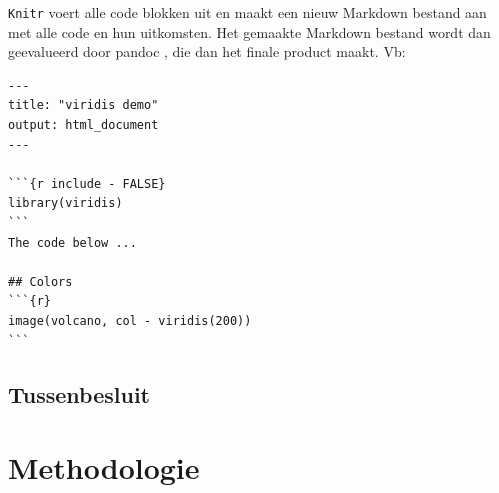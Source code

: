 \texttt{Knitr} voert alle code blokken uit en maakt een nieuw Markdown bestand aan met alle code en hun uitkomsten.
Het gemaakte Markdown bestand wordt dan geevalueerd door pandoc \autocite{pandoc}, die dan het finale product maakt.
Vb:
\begin{verbatim}
---
title: "viridis demo"
output: html_document
---

```{r include - FALSE}
library(viridis)
```
The code below ...

## Colors
```{r}
image(volcano, col - viridis(200))
```
\end{verbatim}

\subsection{Tussenbesluit}



\section{Methodologie}%
\label{sec:methodologie}





